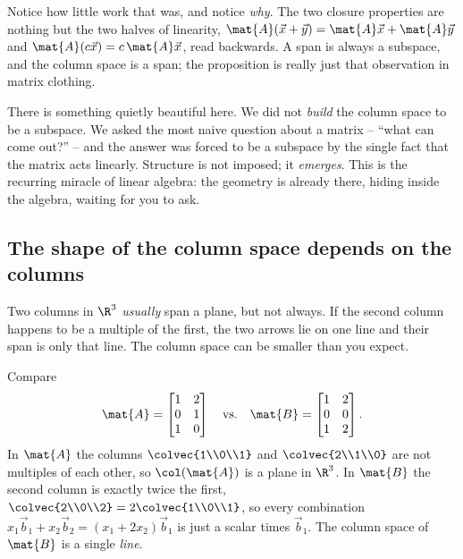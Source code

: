 Notice how little work that was, and notice \emph{why}. The two closure
properties are nothing but the two halves of linearity, $\mat{A}(\vec{x}+\vec{y})
= \mat{A}\vec{x}+\mat{A}\vec{y}$ and $\mat{A}(c\vec{x}) = c\,\mat{A}\vec{x}$, read
backwards. A span is always a subspace, and the column space is a span; the
proposition is really just that observation in matrix clothing.

\begin{aestheticbox}
There is something quietly beautiful here. We did not \emph{build} the column
space to be a subspace. We asked the most naive question about a matrix --
``what can come out?'' -- and the answer was forced to be a subspace by the
single fact that the matrix acts linearly. Structure is not imposed; it
\emph{emerges}. This is the recurring miracle of linear algebra: the geometry is
already there, hiding inside the algebra, waiting for you to ask.
\end{aestheticbox}

\subsection{The shape of the column space depends on the columns}

Two columns in $\R^3$ \emph{usually} span a plane, but not always. If the second
column happens to be a multiple of the first, the two arrows lie on one line and
their span is only that line. The column space can be smaller than you expect.

\begin{example}\label{ch12:dependent-cols}
Compare
\[
  \mat{A} = \begin{bmatrix} 1 & 2 \\ 0 & 1 \\ 1 & 0 \end{bmatrix}
  \quad\text{vs.}\quad
  \mat{B} = \begin{bmatrix} 1 & 2 \\ 0 & 0 \\ 1 & 2 \end{bmatrix}.
\]
In $\mat{A}$ the columns $\colvec{1\\0\\1}$ and $\colvec{2\\1\\0}$ are not
multiples of each other, so $\col(\mat{A})$ is a plane in $\R^3$. In $\mat{B}$
the second column is exactly twice the first, $\colvec{2\\0\\2} = 2\colvec{1\\0\\1}$,
so every combination $x_1\vec{b}_1 + x_2\vec{b}_2 = (x_1+2x_2)\vec{b}_1$ is just a
scalar times $\vec{b}_1$. The column space of $\mat{B}$ is a single \emph{line}.
\end{example}

